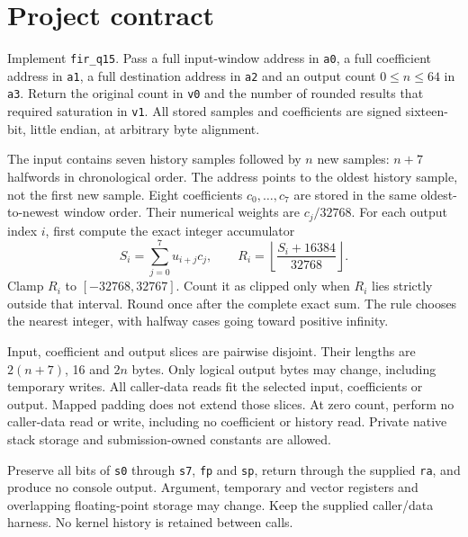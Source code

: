 \section*{Project contract}
Implement \texttt{fir\_q15}. Pass a full input-window address in \texttt{a0}, a full
coefficient address in \texttt{a1}, a full destination address in \texttt{a2} and an
output count \(0\leq n\leq64\) in \texttt{a3}. Return the original count in
\texttt{v0} and the number of rounded results that required saturation in \texttt{v1}.
All stored samples and coefficients are signed sixteen-bit, little endian, at arbitrary
byte alignment.

The input contains seven history samples followed by \(n\) new samples: \(n+7\)
halfwords in chronological order. The address points to the oldest history sample,
not the first new sample. Eight coefficients \(c_0,\ldots,c_7\) are stored in the
same oldest-to-newest window order. Their numerical weights are \(c_j/32768\).
For each output index \(i\), first compute the exact integer accumulator
\[
  S_i=\sum_{j=0}^{7}u_{i+j}c_j,
  \qquad R_i=\left\lfloor\frac{S_i+16384}{32768}\right\rfloor.
\]
Clamp \(R_i\) to \([-32768,32767]\). Count it as clipped only when \(R_i\) lies
strictly outside that interval. Round once after the complete exact sum. The rule
chooses the nearest integer, with halfway cases going toward positive infinity.

Input, coefficient and output slices are pairwise disjoint. Their lengths are
\(2(n+7)\), 16 and \(2n\) bytes. Only logical output bytes may change, including
temporary writes. All caller-data reads fit the selected input, coefficients or output.
Mapped padding does not extend those slices. At zero count, perform no caller-data
read or write, including no coefficient or history read. Private native stack storage
and submission-owned constants are allowed.

Preserve all bits of \texttt{s0} through \texttt{s7}, \texttt{fp} and \texttt{sp},
return through the supplied \texttt{ra}, and produce no console output. Argument,
temporary and vector registers and overlapping floating-point storage may change.
Keep the supplied caller/data harness. No kernel history is retained between calls.
